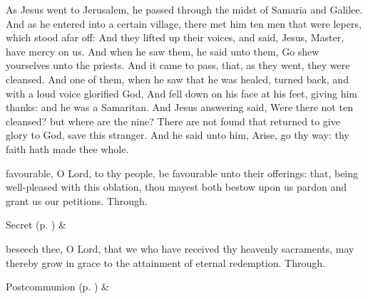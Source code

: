 
 As Jesus went to Jerusalem, he passed through the midst of Samaria and Galilee. And as he entered into a certain village, there met him ten men that were lepers, which stood afar off: And they lifted up their voices, and said, Jesus, Master, have mercy on us. And when he saw them, he said unto them, Go shew yourselves unto the priests. And it came to pass, that, as they went, they were cleansed. And one of them, when he saw that he was healed, turned back, and with a loud voice glorified God, And fell down on his face at his feet, giving him thanks: and he was a Samaritan. And Jesus answering said, Were there not ten cleansed? but where are the nine? There are not found that returned to give glory to God, save this stranger. And he said unto him, Arise, go thy way: thy faith hath made thee whole.


\secret
{} favourable, O Lord, to thy people, be favourable unto their offerings: that, being well-pleased with this oblation, thou mayest both bestow upon us pardon and grant us our petitions. Through.
\begin{rubric}
     Secret  (p. \pageref{SPSaints}) \&  
\end{rubric}


\postcommunion
{} beseech thee, O Lord, that we who have received thy heavenly sacraments, may thereby grow in grace to the attainment of eternal redemption. Through.
\begin{rubric}
     Postcommunion  (p. \pageref{SPSaints}) \&  
\end{rubric}


\clearpage
{}

